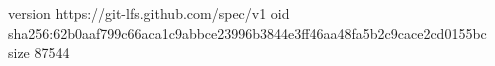 version https://git-lfs.github.com/spec/v1
oid sha256:62b0aaf799c66aca1c9abbce23996b3844e3ff46aa48fa5b2c9cace2cd0155bc
size 87544
